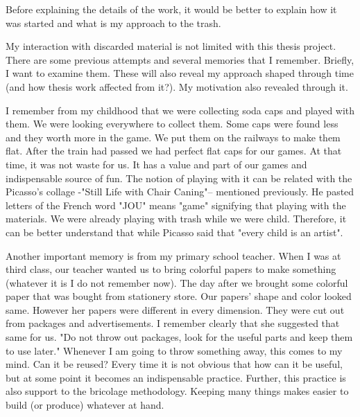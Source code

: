 






Before explaining the details of the work, it would be better to explain how it was started and what is my approach to the trash. %

My interaction with discarded material is not limited with this thesis project. There are some previous attempts and several memories that I remember. Briefly, I want to examine them. These will also reveal my approach shaped through time (and how thesis work affected from it?). My motivation also revealed through it.

I remember from my childhood that we were collecting soda caps and played with them. We were looking everywhere to collect them. Some caps were found less and they worth more in the game. We put them on the railways to make them flat. After the train had passed we had perfect flat caps for our games. At that time, it was not waste for us. It has a value and part of our games and indispensable source of fun. The notion of playing with it can be related with the Picasso's collage -"Still Life with Chair Caning"-- mentioned previously. He pasted letters of the French word "JOU" means "game" signifying that playing with the materials. We were already playing with trash while we were child. Therefore, it can be better understand that while Picasso said that "every child is an artist".

Another important memory is from my primary school teacher. When I was at third class, our teacher wanted us to bring colorful papers to make something (whatever it is I do not remember now). The day after we brought some colorful paper that was bought from stationery store. Our papers' shape and color looked same. However her papers were different in every dimension. They were cut out from packages and advertisements. I remember clearly that she suggested that same for us. "Do not throw out packages, look for the useful parts and keep them to use later." Whenever I am going to throw something away, this comes to my mind. Can it be reused? Every time it is not obvious that how can it be useful, but at some point it becomes an indispensable practice. Further, this practice is also support to the bricolage methodology. Keeping many things makes easier to build (or produce) whatever at hand. 

